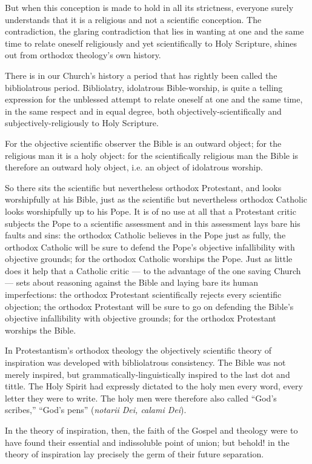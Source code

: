 \documentclass[12pt,a4paper]{book}
\begin{document}
But when this conception is made to hold in all its strictness, everyone surely
understands that it is a religious and not a scientific conception. The
contradiction, the glaring contradiction that lies in wanting at one and the same
time to relate oneself religiously and yet scientifically to Holy Scripture,
shines out from orthodox theology's own history.

There is in our Church's history a period that has rightly been called the
bibliolatrous period. Bibliolatry, idolatrous Bible-worship, is quite a telling
expression for the unblessed attempt to relate oneself at one and the same time,
in the same respect and in equal degree, both objectively-scientifically and
subjectively-religiously to Holy Scripture.

For the objective scientific observer the Bible is an
outward object; for the religious man it is a holy object: for the scientifically
religious man the Bible is therefore an outward holy object, i.e. an object of
idolatrous worship.

So there sits the scientific but nevertheless orthodox Protestant, and looks
worshipfully at his Bible, just as the scientific but nevertheless orthodox
Catholic looks worshipfully up to his Pope. It is of no use at all that a
Protestant critic subjects the Pope to a scientific assessment and in this
assessment lays bare his faults and sins: the orthodox Catholic believes in the
Pope just as fully, the orthodox Catholic will be sure to defend the Pope's
objective infallibility with objective grounds; for the orthodox Catholic
worships the Pope. Just as little does it help that a Catholic critic --- to the
advantage of the one saving Church --- sets about reasoning against the Bible and
laying bare its human imperfections: the orthodox Protestant scientifically
rejects every scientific objection; the orthodox Protestant will be sure to go on
defending the Bible's objective infallibility with objective grounds; for the
orthodox Protestant worships the Bible.

In Protestantism's orthodox theology the objectively scientific theory of
inspiration was developed with bibliolatrous consistency. The Bible was not merely
inspired, but grammatically-linguistically inspired to the last dot and tittle.
The Holy Spirit had expressly dictated to the holy men every word, every letter
they were to write. The holy men were therefore also called ``God's scribes,''
``God's pens'' (\textit{notarii Dei, calami Dei}).

In the theory of inspiration, then, the faith of the Gospel and theology were to
have found their essential and indissoluble point of union; but behold! in the
theory of inspiration lay precisely the germ of their future separation.
\end{document}
